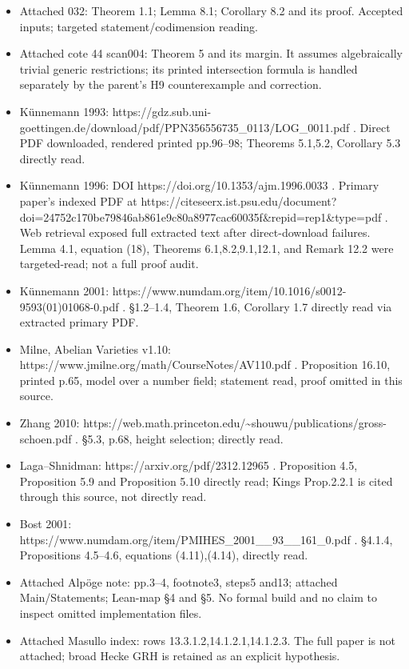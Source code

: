 \documentclass[11pt,a4paper]{article}
\begin{document}
\begin{itemize}
\tightlist
\item
  Attached 032: Theorem 1.1; Lemma 8.1; Corollary 8.2 and its proof.
  Accepted inputs; targeted statement/codimension reading.
\item
  Attached cote 44 scan004: Theorem 5 and its margin. It assumes
  algebraically trivial generic restrictions; its printed intersection
  formula is handled separately by the parent's H9 counterexample and
  correction.
\item
  Künnemann 1993:
  https://gdz.sub.uni-goettingen.de/download/pdf/PPN356556735\_0113/LOG\_0011.pdf
  . Direct PDF downloaded, rendered printed pp.96--98; Theorems 5.1,5.2,
  Corollary 5.3 directly read.
\item
  Künnemann 1996: DOI https://doi.org/10.1353/ajm.1996.0033 . Primary
  paper's indexed PDF at
  https://citeseerx.ist.psu.edu/document?doi=24752c170be79846ab861e9c80a8977cac60035f\&repid=rep1\&type=pdf
  . Web retrieval exposed full extracted text after direct-download
  failures. Lemma 4.1, equation (18), Theorems 6.1,8.2,9.1,12.1, and
  Remark 12.2 were targeted-read; not a full proof audit.
\item
  Künnemann 2001:
  https://www.numdam.org/item/10.1016/s0012-9593(01)01068-0.pdf .
  §1.2--1.4, Theorem 1.6, Corollary 1.7 directly read via extracted
  primary PDF.
\item
  Milne, Abelian Varieties v1.10:
  https://www.jmilne.org/math/CourseNotes/AV110.pdf . Proposition 16.10,
  printed p.65, model over a number field; statement read, proof omitted
  in this source.
\item
  Zhang 2010:
  https://web.math.princeton.edu/\textasciitilde shouwu/publications/gross-schoen.pdf
  . §5.3, p.68, height selection; directly read.
\item
  Laga--Shnidman: https://arxiv.org/pdf/2312.12965 . Proposition 4.5,
  Proposition 5.9 and Proposition 5.10 directly read; Kings Prop.2.2.1
  is cited through this source, not directly read.
\item
  Bost 2001:
  https://www.numdam.org/item/PMIHES\_2001\_\_93\_\_161\_0.pdf . §4.1.4,
  Propositions 4.5--4.6, equations (4.11),(4.14), directly read.
\item
  Attached Alpöge note: pp.3--4, footnote3, steps5 and13; attached
  Main/Statements; Lean-map §4 and §5. No formal build and no claim to
  inspect omitted implementation files.
\item
  Attached Masullo index: rows 13.3.1.2,14.1.2.1,14.1.2.3. The full
  paper is not attached; broad Hecke GRH is retained as an explicit
  hypothesis.
\end{itemize}
\end{document}
